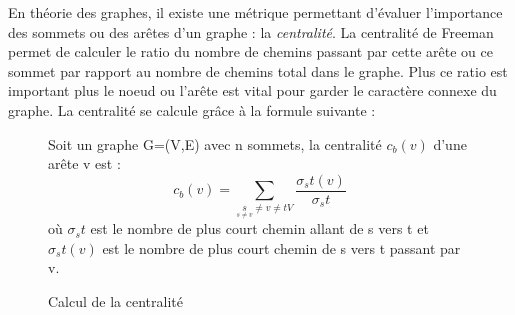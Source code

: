 \par
En th\'eorie des graphes, il existe une m\'etrique permettant d'\'evaluer l'importance des sommets ou des ar\^etes d'un graphe : la \textit{centralit\'e}. La centralit\'e de Freeman permet de calculer le ratio du nombre de chemins passant par cette ar\^ete ou ce sommet par rapport au nombre de chemins total dans le graphe. Plus ce ratio est important plus le noeud ou l'ar\^ete est vital pour garder le caract\`ere connexe du graphe. La centralit\'e se calcule gr\^ace \`a la formule suivante :

\begin{figure}[H]
   \centering
   \frame
   {
      \parbox{12cm}
      {
         Soit un graphe G=(V,E) avec n sommets, la centralité $c_b(v)$ d'une arête v est :
         \begin{equation}
               c_b(v) = \sum_{\underset{s \neq v}s \neq v \neq t V} \frac{\sigma_st(v)}{\sigma_st}
         \end{equation}
	o\`u $\sigma_st$ est le nombre de plus court chemin allant de s vers t et $\sigma_st(v)$ est le nombre de plus court chemin de s vers t passant par v.
      }
   }
  \caption{\label{centralit\'e}Calcul de la centralit\'e}
\end{figure}



%
